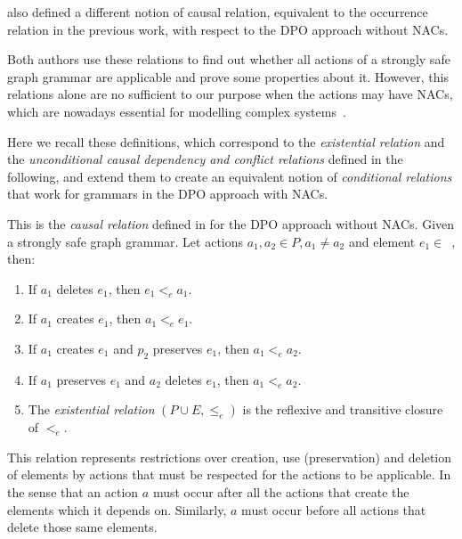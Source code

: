 \cite{Corradini1996} also defined a different notion of causal relation, equivalent to the occurrence relation in the previous work, with respect to the DPO approach without NACs.

Both authors use these relations to find out whether all actions of a strongly safe graph grammar are applicable and prove some properties about it. However, this relations alone are no sufficient to our purpose when the actions may have NACs, which are nowadays essential for modelling complex systems~\cite{Corradini2014}.

Here we recall these definitions, which correspond to the \emph{existential relation} and the \emph{unconditional causal dependency and conflict relations} defined in the following, and extend them to create an equivalent notion of \emph{conditional relations} that work for grammars in the DPO approach with NACs.

\begin{definition} This is the \emph{causal relation} defined in \cite{Corradini1996} for the DPO approach without NACs. Given  \doublyTypedGraphGrammarCore{} a strongly safe graph grammar. Let actions \mbox{$a_1, a_2 \in P, a_1 \ne a_2$} and element \mbox{$e_1 \in $ \coreGraph{}}, then:

  \begin{enumerate}
    \item If $a_1$ deletes $e_1$, then $e_1 <_e a_1$.
    \item If $a_1$ creates $e_1$, then $a_1 <_e e_1$.
    \item If $a_1$ creates $e_1$ and $p_2$ preserves $e_1$, then $a_1 <_e a_2$.
    \item If $a_1$ preserves $e_1$ and $a_2$ deletes $e_1$, then $a_1 <_e a_2$. 
    \item The \emph{existential relation} $(P \cup E, \leq_e)$ is the reflexive and transitive closure of $<_e$.
  \end{enumerate}
\end{definition}

This relation represents restrictions over creation, use (preservation) and deletion of elements by actions that must be respected for the actions to be applicable. In the sense that an action $a$ must occur after all the actions that create the elements which it depends on. Similarly, $a$ must occur before all actions that delete those same elements.

